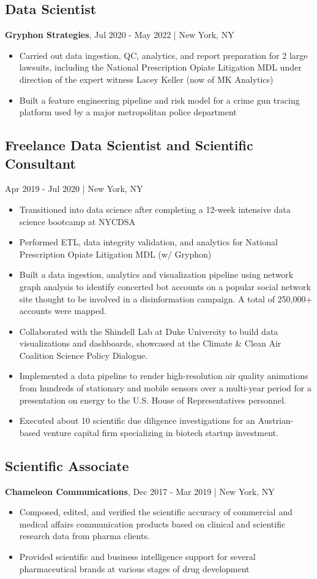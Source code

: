 \documentclass[11pt]{article}
\newenvironment{myitemize}
{ \begin{itemize}
	\setlength{\itemsep}{0pt}
	\setlength{\parskip}{0pt}
	\setlength{\parsep}{0pt}     }
{ \end{itemize}                  }
\begin{document}
\subsection*{Data Scientist}
{\bfseries Gryphon Strategies}, Jul 2020 - May 2022 | New York, NY
\begin{myitemize}
	\item Carried out data ingestion, QC, analytics, and report preparation for 2 large lawsuits, including the National Prescription Opiate Litigation MDL under direction of the expert witness Lacey Keller (now of MK Analytics)
	\item Built a feature engineering pipeline and risk model for a crime gun tracing platform used by a major metropolitan police department
\end{myitemize}

\subsection*{Freelance Data Scientist and Scientific Consultant} Apr 2019 - Jul 2020 | New York, NY
\begin{myitemize}
	\item Transitioned into data science after completing a 12-week intensive data science bootcamp at NYCDSA 
	\item Performed ETL, data integrity validation, and analytics for National Prescription Opiate Litigation MDL (w/ Gryphon)
	\item Built a data ingestion, analytics and visualization pipeline using network graph analysis to identify concerted bot accounts on a popular social network site thought to be involved in a disinformation campaign. A total of 250,000+ accounts were mapped.
	\item Collaborated with the Shindell Lab at Duke University to build data visualizations and dashboards, showcased at the Climate \& Clean Air Coalition Science Policy Dialogue.
	\item Implemented a data pipeline to render high-resolution air quality animations from hundreds of stationary and mobile sensors over a multi-year period for a presentation on energy to the U.S. House of Representatives personnel. 
	\item Executed about 10 scientific due diligence investigations for an Austrian-based venture capital firm specializing in biotech startup investment.
\end{myitemize}

\subsection*{Scientific Associate}
{\bfseries Chameleon Communications}, Dec 2017 - Mar 2019 | New York, NY
\begin{myitemize}
	\item Composed, edited, and verified the scientific accuracy of commercial and medical affairs communication products based on clinical and scientific research data from pharma clients.
	\item Provided scientific and business intelligence support for several pharmaceutical brands at various stages of drug development
\end{myitemize}
\end{document}

